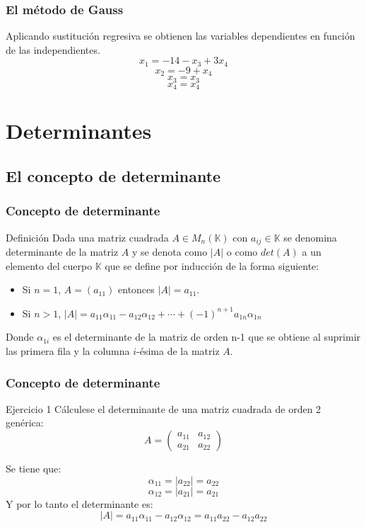 \documentclass[aspectratio=169]{beamer}
\begin{document}
                     \begin{frame}
    \frametitle{El m\'etodo de Gauss}
Aplicando sustituci\'on regresiva se obtienen las variables dependientes en funci\'on de las independientes.
\[x_1 = -14-x_3+3x_4\]
\[ x_2 = -9+x_4\]
\[ x_3 = x_3\]
\[ x_4 = x_4\]
  \end{frame} 
  
  
  
  \section{Determinantes}
  \subsection{El concepto de determinante}
  
       \begin{frame}
  \frametitle{Concepto de determinante}
   \begin{block}{Definici\'on}
Dada una matriz cuadrada $A\in M_n(\mathbb{K})$ con $a_{ij}\in \mathbb{K}$ se denomina determinante de la matriz $A$ y se denota como $|A|$ o como $det(A)$ a un elemento del cuerpo $\mathbb{K}$ que se define por inducci\'on de la forma siguiente:
\begin{itemize}
\item Si $n=1$, $A=(a_{11})$ entonces $|A| = a_{11}$.
\item Si $n>1$, $|A| = a_{11}\alpha_{11}-a_{12}\alpha_{12}+\cdots+(-1)^{n+1}a_{1n}\alpha_{1n}$ 
\end{itemize} 
Donde $\alpha_{1i}$ es el determinante de la matriz de orden n-1 que se obtiene al suprimir las primera fila y la columna $i$-\'esima de la matriz $A$.
\end{block}
  \end{frame} 
  
  
       \begin{frame}
  \frametitle{Concepto de determinante}
   \begin{block}{Ejercicio 1}
C\'alculese el determinante de una matriz cuadrada de orden 2 gen\'erica:
\[A=  \left(\begin{array}{cc}a_{11}&a_{12} \\a_{21}&a_{22} \end{array}\right) \]
\end{block}
Se tiene que:
\[\alpha_{11} = |a_{22}| = a_{22}\]
\[\alpha_{12} = |a_{21}| = a_{21}\]
Y por lo tanto el determinante es:
\[|A| = a_{11}\alpha_{11}-a_{12}\alpha_{12} = a_{11}a_{22}-a_{12}a_{22}\]
  \end{frame} 
  
\end{document}
